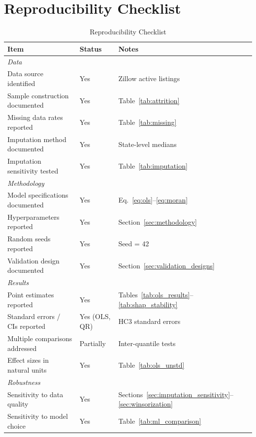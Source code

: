 \section{Reproducibility Checklist}
\label{app:reproducibility}

\begin{table}[H]
\centering
\caption{Reproducibility Checklist}
\label{tab:reproducibility}
\begin{threeparttable}
\small
\begin{tabular}{p{6cm}p{3cm}p{4cm}}
\toprule
Item & Status & Notes \\
\midrule
\multicolumn{3}{l}{\textit{Data}} \\
Data source identified & Yes & Zillow active listings \\
Sample construction documented & Yes & Table~\ref{tab:attrition} \\
Missing data rates reported & Yes & Table~\ref{tab:missing} \\
Imputation method documented & Yes & State-level medians \\
Imputation sensitivity tested & Yes & Table~\ref{tab:imputation} \\
\midrule
\multicolumn{3}{l}{\textit{Methodology}} \\
Model specifications documented & Yes & Eq.~\ref{eq:ols}--\ref{eq:moran} \\
Hyperparameters reported & Yes & Section~\ref{sec:methodology} \\
Random seeds reported & Yes & Seed = 42 \\
Validation design documented & Yes & Section~\ref{sec:validation_designs} \\
\midrule
\multicolumn{3}{l}{\textit{Results}} \\
Point estimates reported & Yes & Tables~\ref{tab:ols_results}--\ref{tab:shap_stability} \\
Standard errors / CIs reported & Yes (OLS, QR) & HC3 standard errors \\
Multiple comparisons addressed & Partially & Inter-quantile tests \\
Effect sizes in natural units & Yes & Table~\ref{tab:ols_unstd} \\
\midrule
\multicolumn{3}{l}{\textit{Robustness}} \\
Sensitivity to data quality & Yes & Sections~\ref{sec:imputation_sensitivity}--\ref{sec:winsorization} \\
Sensitivity to model choice & Yes & Table~\ref{tab:ml_comparison} \\

\end{tabular}
\end{threeparttable}
\end{table}
